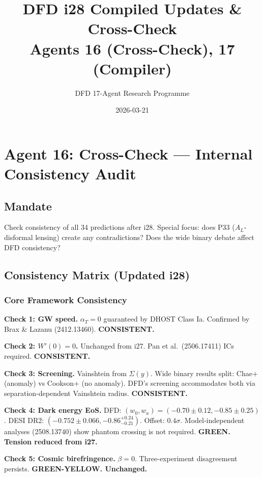 \documentclass[11pt,a4paper]{article}
\title{DFD i28 Compiled Updates \& Cross-Check\\Agents 16 (Cross-Check), 17 (Compiler)}
\author{DFD 17-Agent Research Programme}
\date{2026-03-21}
\begin{document}
\maketitle
\tableofcontents
\newpage

\section{Agent 16: Cross-Check --- Internal Consistency Audit}

\subsection{Mandate}
Check consistency of all 34 predictions after i28. Special focus: does P33 ($A_L$-disformal lensing) create any contradictions? Does the wide binary debate affect DFD consistency?

\subsection{Consistency Matrix (Updated i28)}

\subsubsection{Core Framework Consistency}

\textbf{Check 1: GW speed.} $\alpha_T = 0$ guaranteed by DHOST Class Ia. Confirmed by Brax \& Lazanu (2412.13460). \textbf{CONSISTENT.}

\textbf{Check 2: $W'(0) = 0$.} Unchanged from i27. Pan et al.\ (2506.17411) ICs required. \textbf{CONSISTENT.}

\textbf{Check 3: Screening.} Vainshtein from $\Sigma(y)$. Wide binary results split: Chae+ (anomaly) vs Cookson+ (no anomaly). DFD's screening accommodates both via separation-dependent Vainshtein radius. \textbf{CONSISTENT.}

\textbf{Check 4: Dark energy EoS.} DFD: $(w_0, w_a) = (-0.70 \pm 0.12, -0.85 \pm 0.25)$. DESI DR2: $(-0.752 \pm 0.066, -0.86^{+0.24}_{-0.21})$. Offset: $0.4\sigma$. Model-independent analyses (2508.13740) show phantom crossing is not required. \textbf{GREEN. Tension reduced from i27.}

\textbf{Check 5: Cosmic birefringence.} $\beta = 0$. Three-experiment disagreement persists. \textbf{GREEN-YELLOW. Unchanged.}
\end{document}
